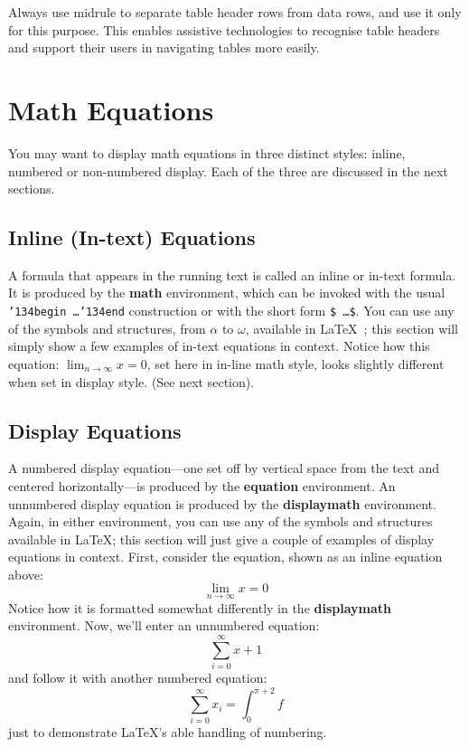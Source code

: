 \documentclass[sigplan,screen]{acmart}
\begin{document}
Always use midrule to separate table header rows from data rows, and
use it only for this purpose. This enables assistive technologies to
recognise table headers and support their users in navigating tables
more easily.
\section{Math Equations}
You may want to display math equations in three distinct styles:
inline, numbered or non-numbered display.  Each of the three are
discussed in the next sections.
\subsection{Inline (In-text) Equations}
A formula that appears in the running text is called an inline or
in-text formula.  It is produced by the \textbf{math} environment,
which can be invoked with the usual
\texttt{{\char'134}begin\,\ldots{\char'134}end} construction or with
the short form \texttt{\$\,\ldots\$}. You can use any of the symbols
and structures, from $\alpha$ to $\omega$, available in
\LaTeX~\cite{Lamport:LaTeX}; this section will simply show a few
examples of in-text equations in context. Notice how this equation:
\begin{math}
	\lim_{n\rightarrow \infty}x=0
\end{math},
set here in in-line math style, looks slightly different when
set in display style.  (See next section).
\subsection{Display Equations}
A numbered display equation---one set off by vertical space from the
text and centered horizontally---is produced by the \textbf{equation}
environment. An unnumbered display equation is produced by the
\textbf{displaymath} environment.
Again, in either environment, you can use any of the symbols and
structures available in \LaTeX\@; this section will just give a couple
of examples of display equations in context.  First, consider the
equation, shown as an inline equation above:
\begin{equation}
	\lim_{n\rightarrow \infty}x=0
\end{equation}
Notice how it is formatted somewhat differently in
the \textbf{displaymath}
environment.  Now, we'll enter an unnumbered equation:
\begin{displaymath}
	\sum_{i=0}^{\infty} x + 1
\end{displaymath}
and follow it with another numbered equation:
\begin{equation}
	\sum_{i=0}^{\infty}x_i=\int_{0}^{\pi+2} f
\end{equation}
just to demonstrate \LaTeX's able handling of numbering.
\end{document}
